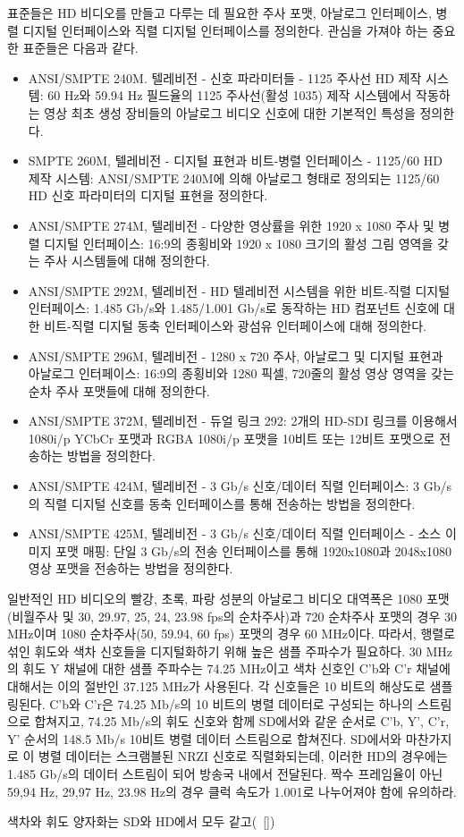 표준들은 HD 비디오를 만들고 다루는 데 필요한 주사 포맷, 아날로그 인터페이스, 병렬 디지털 인터페이스와 직렬 디지털 인터페이스를 정의한다. 관심을 가져야 하는 중요한 표준들은 다음과 같다.
\begin{itemize}
    \item ANSI/SMPTE 240M. 텔레비전 - 신호 파라미터들 - 1125 주사선 HD 제작 시스템: 60 Hz와 59.94 Hz 필드율의 1125 주사선(활성 1035) 제작 시스템에서 작동하는 영상 최초 생성 장비들의 아날로그 비디오 신호에 대한 기본적인 특성을 정의한다.
    \item SMPTE 260M, 텔레비전 - 디지털 표현과 비트-병렬 인터페이스 - 1125/60 HD 제작 시스템: ANSI/SMPTE 240M에 의해 아날로그 형태로 정의되는 1125/60 HD 신호 파라미터의 디지털 표현을 정의한다.
    \item ANSI/SMPTE 274M, 텔레비전 - 다양한 영상률을 위한 1920 x 1080 주사 및 병렬 디지털 인터페이스: 16:9의 종횡비와 1920 x 1080 크기의 활성 그림 영역을 갖는 주사 시스템들에 대해 정의한다.
    \item ANSI/SMPTE 292M, 텔레비전 - HD 텔레비전 시스템을 위한 비트-직렬 디지털 인터페이스: 1.485 Gb/s와 1.485/1.001 Gb/s로 동작하는 HD 컴포넌트 신호에 대한 비트-직렬 디지털 동축 인터페이스와 광섬유 인터페이스에 대해 정의한다.
    \item ANSI/SMPTE 296M, 텔레비전 - 1280 x 720 주사, 아날로그 및 디지털 표현과 아날로그 인터페이스: 16:9의 종횡비와 1280 픽셀, 720줄의 활성 영상 영역을 갖는 순차 주사 포맷들에 대해 정의한다.
    \item ANSI/SMPTE 372M, 텔레비전 - 듀얼 링크 292: 2개의 HD-SDI 링크를 이용해서 1080i/p YCbCr 포맷과 RGBA 1080i/p 포맷을 10비트 또는 12비트 포맷으로 전송하는 방법을 정의한다.
    \item ANSI/SMPTE 424M, 텔레비전 - 3 Gb/s 신호/데이터 직렬 인터페이스: 3 Gb/s의 직렬 디지털 신호를 동축 인터페이스를 통해 전송하는 방법을 정의한다.
    \item ANSI/SMPTE 425M, 텔레비전 - 3 Gb/s 신호/데이터 직렬 인터페이스 - 소스 이미지 포맷 매핑: 단일 3 Gb/s의 전송 인터페이스를 통해 1920x1080과 2048x1080 영상 포맷을 전송하는 방법을 정의한다.
\end{itemize}



일반적인 HD 비디오의 빨강, 초록, 파랑 성분의 아날로그 비디오 대역폭은 1080 포맷(비월주사 및  30, 29.97, 25, 24, 23.98 fps의 순차주사)과 720 순차주사 포맷의 경우 30 MHz이며 1080 순차주사(50, 59.94, 60 fps) 포맷의 경우 60 MHz이다.
따라서, 행렬로 섞인 휘도와 색차 신호들을 디지털화하기 위해 높은 샘플 주파수가 필요하다. 30 MHz의 휘도 Y 채널에 대한 샘플 주파수는 74.25 MHz이고 색차 신호인 C'b와 C'r 채널에 대해서는 이의 절반인 37.125 MHz가 사용된다.
각 신호들은 10 비트의 해상도로 샘플링된다. C'b와 C'r은 74.25 Mb/s의 10 비트의 병렬 데이터로 구성되는 하나의 스트림으로 합쳐지고, 74.25 Mb/s의 휘도 신호와 함께 SD에서와 같운 순서로 C'b, Y', C'r, Y' 순서의 148.5 Mb/s 10비트 병렬 데이터 스트림으로 합쳐진다.
SD에서와 마찬가지로 이 병렬 데이터는 스크램블된 NRZI 신호로 직렬화되는데, 이러한 HD의 경우에는 1.485 Gb/s의 데이터 스트림이 되어 방송국 내에서 전달된다. 짝수 프레임율이 아닌 59,94 Hz, 29,97 Hz, 23.98 Hz의 경우 클럭 속도가 1.001로 나누어져야 함에 유의하라.

색차와 휘도 양자화는 SD와 HD에서 모두 같고(\figurename~\ref{})